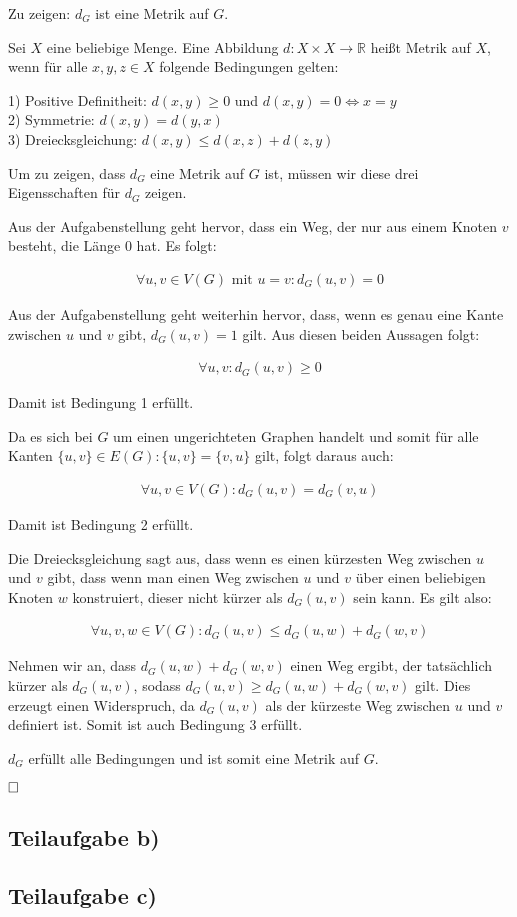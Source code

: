 \documentclass[12pt]{scrartcl}%
\theoremstyle{nonumberplain}
\newcommand{\R}{\mathbb{R}}
\begin{document}
Zu zeigen: $d_G$ ist eine Metrik auf $G$.

Sei $X$ eine beliebige Menge. Eine Abbildung $d: X \times X \rightarrow \R$ heißt Metrik auf $X$, wenn für alle $x,y,z \in X$ folgende Bedingungen gelten:

1) Positive Definitheit: $d(x,y) \ge 0$ und $d(x,y) = 0 \Leftrightarrow x = y $ \\
2) Symmetrie: $d(x,y) = d(y,x)$ \\
3) Dreiecksgleichung: $d(x,y) \le d(x,z) + d(z,y)$

Um zu zeigen, dass $d_G$ eine Metrik auf $G$ ist, müssen wir diese drei Eigensschaften für $d_G$ zeigen.

Aus der Aufgabenstellung geht hervor, dass ein Weg, der nur aus einem Knoten $v$ besteht, die Länge $0$ hat. Es folgt:

\begin{align*}
	\forall u,v \in V(G)\text{ mit } u=v: d_G(u,v) = 0
\end{align*}

Aus der Aufgabenstellung geht weiterhin hervor, dass, wenn es genau eine Kante zwischen $u$ und $v$ gibt, $d_G(u,v) = 1$ gilt.  Aus diesen beiden Aussagen folgt:

\begin{align*}
	\forall u,v: d_G(u,v) \ge 0
\end{align*}

Damit ist Bedingung 1 erfüllt.

Da es sich bei $G$ um einen ungerichteten Graphen handelt und somit für alle Kanten $\{u,v\} \in E(G): \{u,v\} = \{v,u\}$ gilt, folgt daraus auch:

\begin{align*}
	\forall u,v \in V(G): d_G(u,v) = d_G(v,u)
\end{align*}

Damit ist Bedingung 2 erfüllt.

Die Dreiecksgleichung sagt aus, dass wenn es einen kürzesten Weg zwischen $u$ und $v$ gibt, dass wenn man einen Weg zwischen $u$ und $v$ über einen beliebigen Knoten $w$ konstruiert, dieser nicht kürzer als $d_G(u,v)$ sein kann. Es gilt also:

\begin{align*}
	\forall u,v,w \in V(G): d_G(u,v) \le d_G(u,w) + d_G(w,v)
\end{align*}

Nehmen wir an, dass $d_G(u,w) + d_G(w,v)$ einen Weg ergibt, der tatsächlich kürzer als $d_G(u,v)$, sodass $d_G(u,v) \ge d_G(u,w) + d_G(w,v)$ gilt. Dies erzeugt einen Widerspruch, da $d_G(u,v)$ als der kürzeste Weg zwischen $u$ und $v$ definiert ist. Somit ist auch Bedingung 3 erfüllt.

$d_G$ erfüllt alle Bedingungen und ist somit eine Metrik auf $G$.

$\hfill \square$

\subsection*{Teilaufgabe b)}


\subsection*{Teilaufgabe c)}
\end{document}
